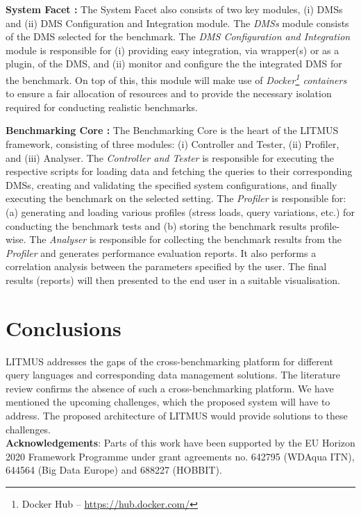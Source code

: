 \documentclass{llncs}
\begin{document}
        \textbf{System Facet :} The System Facet also consists of two key modules, (i) DMSs and (ii) DMS Configuration and Integration module.
        The \textit{DMSs} module consists of the DMS selected for the benchmark.
        The \textit{DMS Configuration and Integration} module is responsible for (i) providing easy integration, via wrapper(s) or as a plugin, of the DMS, and (ii) monitor and configure the the integrated DMS for the benchmark.
        On top of this, this module will make use of \textit{Docker\footnote{Docker Hub -- \url{https://hub.docker.com/}} containers} to ensure a fair allocation of resources and to provide the necessary isolation required for conducting realistic benchmarks. 
        
        \textbf{Benchmarking Core :} The Benchmarking Core is the heart of the LITMUS framework, consisting of three modules: (i) Controller and Tester, (ii) Profiler, and (iii) Analyser.
        The \textit{Controller and Tester} is responsible for executing the respective scripts for loading data and fetching the queries to their corresponding DMSs, creating and validating the specified system configurations, and finally executing the benchmark on the selected setting.
        The \textit{Profiler} is responsible for: (a) generating and loading various profiles (stress loads, query variations, etc.) for conducting the benchmark tests and (b) storing the benchmark results profile-wise. The \textit{Analyser} is responsible for collecting the benchmark results from the \textit{Profiler} and generates performance evaluation reports.
        It also performs a correlation analysis between the parameters specified by the user. The final results (reports) will then presented to the end user in a suitable visualisation.
        
\section{Conclusions}\label{conclusion} 
LITMUS addresses the gaps of the cross-benchmarking platform for different query languages and corresponding data management solutions. 
The literature review confirms the absence of such a cross-benchmarking platform.
We have mentioned the upcoming challenges, which the proposed system will have to address.
The proposed architecture of LITMUS would provide solutions to these challenges. \\
\textbf{Acknowledgements}: Parts of this work have been supported by the EU Horizon 2020 Framework Programme under grant agreements no. 642795 (WDAqua ITN), 644564 (Big Data Europe) and 688227 (HOBBIT).



\end{document}
